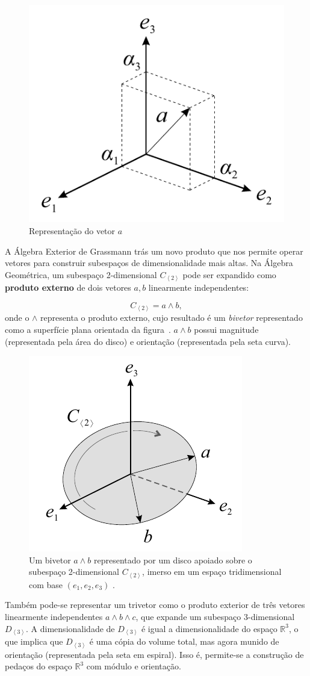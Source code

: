 \documentclass[11pt]{article}
\begin{document}
\begin{figure}[H]
	\begin{center}
		\includegraphics[width=0.25\linewidth]{figures/aR3.png}
	\end{center}
	\caption{Representação do vetor $a$ \cite{leandro2017algebra}}
	\label{fig:r3}
\end{figure}

A Álgebra Exterior de Grassmann trás um novo produto que nos permite operar vetores para construir subespaços de dimensionalidade mais altas. Na Álgebra Geométrica, um subespaço 2-dimensional $C_{\left <2 \right >}$ pode ser expandido como \textbf{produto externo} de dois vetores $a,b$ linearmente independentes:

$$C_{\left <2 \right >} = a \wedge b,$$
onde o $\wedge$ representa o produto externo, cujo resultado é um \textit{bivetor} representado como a superfície plana orientada da figura~\label{fig:2blade}. $a\wedge b$ possui magnitude (representada pela área do disco) e orientação (representada pela seta curva). 

\begin{figure}[H]
	\begin{center}
		\includegraphics[width=0.25\linewidth]{figures/2blade.png}
	\end{center}
	\caption{Um bivetor $a\wedge b$ representado por um disco apoiado sobre o subespaço 2-dimensional $C_{\left < 2\right >}$, imerso em um espaço tridimensional com base $(e_1,e_2,e_3)$  \cite{leandro2017algebra}.}
	\label{fig:2blade}
\end{figure}

Também pode-se representar um trivetor como o produto exterior de três vetores linearmente independentes $a\wedge b\wedge c$, que expande um subespaço 3-dimensional $D_{\left < 3 \right >}$. A dimensionalidade de $D_{\left < 3 \right >}$ é igual a dimensionalidade do espaço $\mathbb{R}^3$, o que implica que $D_{\left < 3 \right >}$ é uma cópia do volume total, mas agora munido de orientação (representada pela seta em espiral). Isso é, permite-se a construção de pedaços do espaço $\mathbb{R}^3$ com módulo e orientação.
\end{document}
